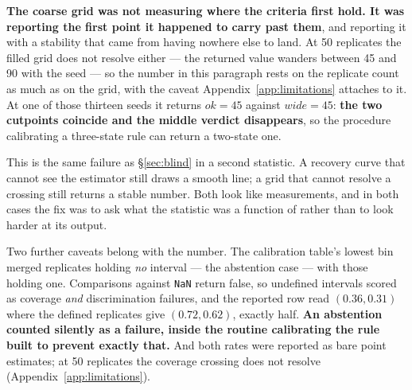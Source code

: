 \textbf{The coarse grid was not measuring where the criteria first hold. It was
reporting the first point it happened to carry past them}, and reporting it with
a stability that came from having nowhere else to land. At 50 replicates the
filled grid does not resolve either --- the returned value wanders between 45 and
90 with the seed --- so the number in this paragraph rests on the replicate count
as much as on the grid, with the caveat Appendix~\ref{app:limitations} attaches
to it. At one of those thirteen seeds it returns $ok = 45$ against $wide = 45$:
\textbf{the two cutpoints coincide and the middle verdict disappears}, so the
procedure calibrating a three-state rule can return a two-state one.

This is the same failure as \S\ref{sec:blind} in a second statistic. A recovery
curve that cannot see the estimator still draws a smooth line; a grid that
cannot resolve a crossing still returns a stable number. Both look like
measurements, and in both cases the fix was to ask what the statistic was a
function of rather than to look harder at its output.

Two further caveats belong with the number. The calibration
table's lowest bin merged replicates holding \emph{no} interval --- the
abstention case --- with those holding one. Comparisons against \texttt{NaN}
return false, so undefined intervals scored as coverage \emph{and}
discrimination failures, and the reported row read $(0.36, 0.31)$ where the
defined replicates give $(0.72, 0.62)$, exactly half. \textbf{An abstention
counted silently as a failure, inside the routine calibrating the rule built to
prevent exactly that.} And both rates were reported as bare point estimates; at
50 replicates the coverage crossing does not resolve
(Appendix~\ref{app:limitations}).
